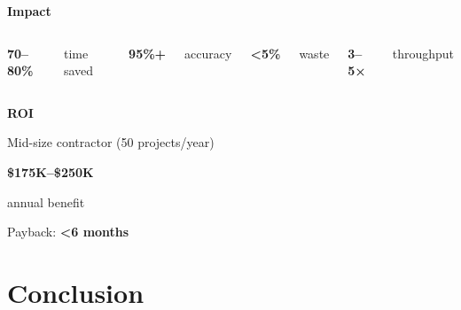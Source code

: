 \documentclass[11pt,aspectratio=169]{beamer}
\begin{document}
\begin{frame}{}
\centering
\vspace{1em}
{\LARGE \textbf{Impact}}

\vspace{2em}
\begin{columns}
\centering
{\Huge \textcolor{vtorange}{\textbf{70--80\%}}}

\vspace{0.5em}
{\large time saved}

\vspace{2em}
{\Huge \textcolor{vtmaroon}{\textbf{95\%+}}}

\vspace{0.5em}
{\large accuracy}

\centering
{\Huge \textcolor{vtorange}{\textbf{<5\%}}}

\vspace{0.5em}
{\large waste}

\vspace{2em}
{\Huge \textcolor{vtmaroon}{\textbf{3--5×}}}

\vspace{0.5em}
{\large throughput}
\end{columns}
\end{frame}

\begin{frame}{}
\centering
\vspace{2em}
{\LARGE \textbf{ROI}}

\vspace{1em}
{\large Mid-size contractor (50 projects/year)}

\vspace{2em}
{\Huge \textcolor{vtorange}{\textbf{\$175K--\$250K}}}

\vspace{1em}
{\large annual benefit}

\vspace{3em}
{\Large Payback: \textcolor{vtmaroon}{\textbf{<6 months}}}
\end{frame}

\section{Conclusion}
\end{document}
